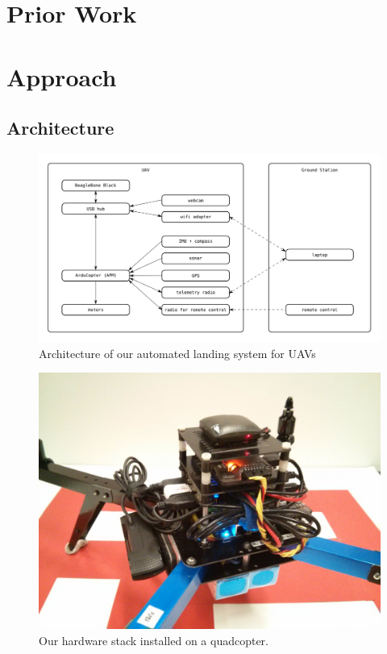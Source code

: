 \documentclass[10pt]{scrartcl} %
\begin{document}
\section{Prior Work}

\section{Approach}

\subsection{Architecture}

\begin{figure}[h]
    \centering
    \includegraphics[width=\textwidth]{images/architecture.png}
    \caption{Architecture of our automated landing system for UAVs}
    \label{fig:architecture}
\end{figure}

\begin{figure}[h]
    \centering
    \includegraphics[width=\textwidth]{images/hardware.jpg}
    \caption{Our hardware stack installed on a quadcopter.}
    \label{fig:hardware}
\end{figure}
\end{document}
